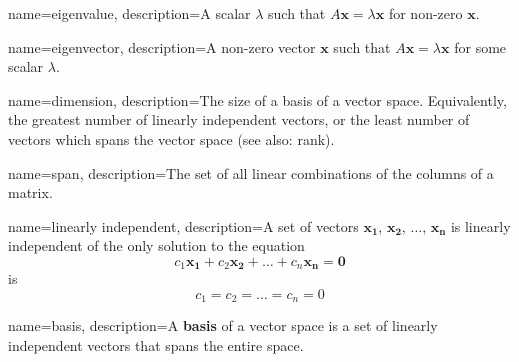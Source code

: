{
        name=eigenvalue,
        description={A scalar \(\lambda\) such that \(A\mathbf{x}=\lambda\mathbf{x}\) for non-zero \(\mathbf{x}\).}
}

{
        name=eigenvector,
        description={A non-zero vector \(\mathbf{x}\) such that \(A\mathbf{x}=\lambda\mathbf{x}\) for some scalar \(\lambda\).}
}

{
        name=dimension,
        description={The size of a basis of a vector space. Equivalently, the greatest number of linearly independent vectors, or the least number of vectors which spans the vector space (see also: rank).}
}

{
        name=span,
        description={The set of all linear combinations of the columns of a matrix.}
}

{
        name=linearly independent,
        description={A set of vectors \(\mathbf{x_1}\), \(\mathbf{x_2}\), \(\hdots\), \(\mathbf{x_n}\) is linearly independent of the only solution to the equation \[c_1\mathbf{x_1}+c_2\mathbf{x_2}+\hdots+c_n\mathbf{x_n}=\mathbf{0}\] is \[c_1=c_2=\hdots=c_n=0\]}
}

{
        name=basis,
        description={A \textbf{basis} of a vector space is a set of linearly independent vectors that spans the entire space.}
}